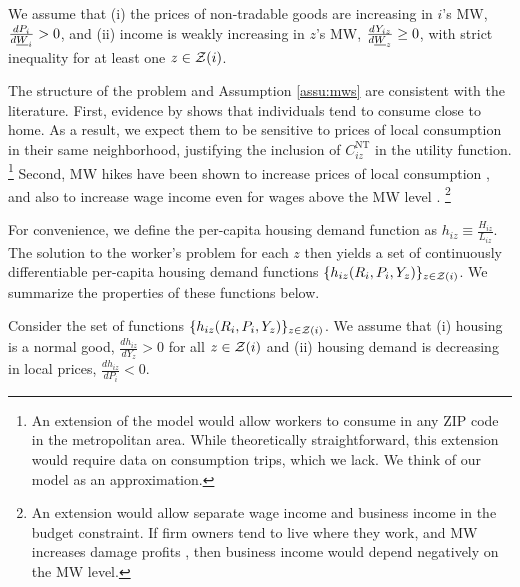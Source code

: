 \begin{assu}\label{assu:mws}
    We assume that
    (i) the prices of non-tradable goods are increasing in $i$'s MW, 
    $\frac{d P_i}{d \underline{W}_i} > 0$, and
    (ii) income is weakly increasing in $z$'s MW, 
    $\frac{d Y_{iz}}{d \underline{W}_z} \geq 0$, with strict inequality 
    for at least one $z\in\mathcal{Z}(i)$.
\end{assu}

The structure of the problem and Assumption \ref{assu:mws} 
are consistent with the literature.
First, evidence by \textcite{MiyauchiEtAl2021} shows that individuals tend to 
consume close to home.
As a result, we expect them to be sensitive to prices of local consumption in 
their same neighborhood, justifying the inclusion of $C^{\text{NT}}_{iz}$ in the 
utility function.%
\footnote{An extension of the model would allow workers to consume in any ZIP 
code in the metropolitan area.
While theoretically straightforward, this extension would require data on 
consumption trips, which we lack.
We think of our model as an approximation.}
Second, MW hikes have been shown to increase prices of local consumption 
\parencite[e.g.,][]{AllegrettoReich2018, Leung2021},
and also to increase wage income even for wages above the MW level 
\parencite[e.g.,][]{CegnizEtAl2019,Dube2019Income}.%
\footnote{An extension would allow separate wage income and business income in 
the budget constraint.
If firm owners tend to live where they work, and MW increases damage profits
\parencite[as found by, e.g.,][]{DracaMachinVanreenen2011, HarasztosiLidner2019},
then business income would depend negatively on the MW level.}

For convenience, we define the per-capita housing demand function as 
$h_{iz} \equiv \frac{H_{iz}}{L_{iz}}$.
The solution to the worker's problem for each $z$ then yields a set of 
continuously differentiable per-capita housing demand functions 
$\{h_{iz} (R_i, P_i, Y_z)\}_{z\in\mathcal{Z}(i)}$.
We summarize the properties of these functions below.

\begin{assu}\label{assu:housing_demand}
    Consider the set of functions $\{h_{iz} (R_i, P_i, Y_z)\}_{z\in\mathcal{Z}(i)}$.
    We assume that
    (i) housing is a normal good, 
    $\frac{d h_{iz}}{d Y_z} > 0$ for all $z\in\mathcal{Z}(i)$
    and
    (ii) housing demand is decreasing in local prices, 
    $\frac{d h_{iz}}{d P_i} < 0$.
\end{assu}

